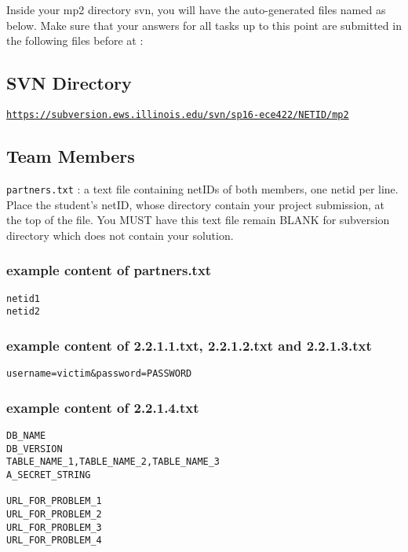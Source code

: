 \documentclass[letterpaper,12pt]{report}
\begin{document}
Inside your mp2 directory svn, you will have the auto-generated files named as below.  Make sure that your answers for all tasks up to this point are submitted in the following files before \textbf{\duedate} at \textbf{\duetime}:

\subsection*{SVN Directory}
\href{https://subversion.ews.illinois.edu/svn/sp16-ece422/NETID/mp2}{\texttt{https://subversion.ews.illinois.edu/svn/sp16-ece422/NETID/mp2}}

\subsection*{Team Members}
\texttt{partners.txt} : a text file containing netIDs of both members, one netid per line. Place the student's netID, whose directory contain your project submission, at the top of the file. You MUST have this text file remain BLANK for subversion directory which does not contain your solution.


\subsubsection*{example content of partners.txt}
\begin{mdframed}
\begin{Verbatim}
netid1 
netid2
\end{Verbatim}
\end{mdframed}

\subsubsection*{example content of 2.2.1.1.txt, 2.2.1.2.txt and 2.2.1.3.txt}
\begin{mdframed}
\begin{Verbatim}
username=victim&password=PASSWORD
\end{Verbatim}
\end{mdframed}

\subsubsection*{example content of 2.2.1.4.txt}
\begin{mdframed}
\begin{Verbatim}
DB_NAME
DB_VERSION
TABLE_NAME_1,TABLE_NAME_2,TABLE_NAME_3
A_SECRET_STRING

URL_FOR_PROBLEM_1
URL_FOR_PROBLEM_2
URL_FOR_PROBLEM_3
URL_FOR_PROBLEM_4
\end{Verbatim}
\end{mdframed}
\end{document}
